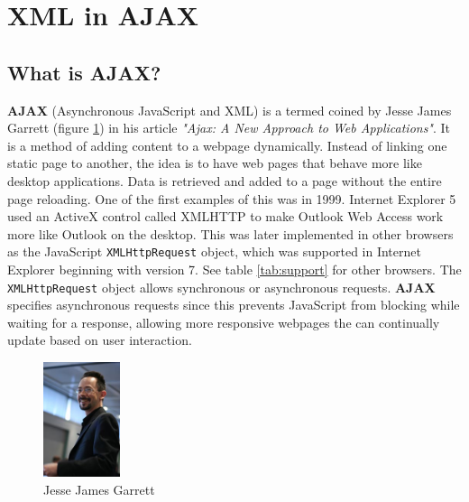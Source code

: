 \documentclass[10pt,a4paper]{article}
\begin{document}
\paragraph{}



\newpage
\section{XML in AJAX}
\subsection{What is AJAX?}
\textbf{AJAX} (Asynchronous JavaScript and XML) is a termed coined by Jesse James Garrett (figure \ref{fig:jjg}) in his article \textit{"Ajax: A New Approach to Web Applications"}\cite{JJG:AJAX}. It is a method of adding content to a webpage dynamically. Instead of linking one static page to another, the idea is to have web pages that behave more like desktop applications. Data is retrieved and added to a page without the entire page reloading. One of the first examples of this was in 1999. Internet Explorer 5 used an ActiveX control called XMLHTTP to make Outlook Web Access work more like Outlook on the desktop\cite{Wiki:XML}. This was later implemented in other browsers as the JavaScript \texttt{XMLHttpRequest} object, which was supported in Internet Explorer beginning with version 7\cite{MDN:XML}. See table \ref{tab:support} for other browsers. The \texttt{XMLHttpRequest} object allows synchronous or asynchronous requests\cite{MDN:XML}. \textbf{AJAX} specifies asynchronous requests since this prevents JavaScript from blocking while waiting for a response, allowing more responsive webpages the can continually update based on user interaction.
\begin{figure}[h]
	\centering
	\includegraphics[width=0.2\textwidth]{jjg.jpg}
	\caption{Jesse James Garrett\cite{JJG:Photo}}
	\label{fig:jjg}
\end{figure}
\end{document}
